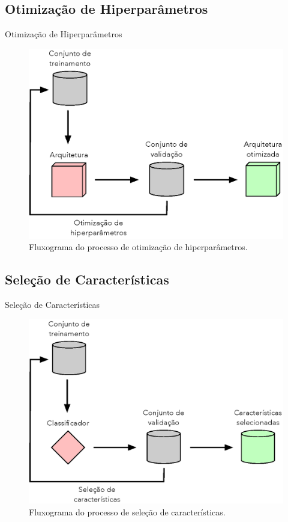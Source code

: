 \subsection{Otimização de Hiperparâmetros}
\label{ss.applications_hyperparameter}

\begin{frame}{Otimização de Hiperparâmetros}
	\begin{figure}
		\centering
		\includegraphics[scale=0.375]{figs/hyperparameter_opt.eps}	
		\caption{Fluxograma do processo de otimização de hiperparâmetros.}
		\label{f.hyperparameter_opt}
	\end{figure}
\end{frame}

\subsection{Seleção de Características}
\label{ss.applications_feature_selection}

\begin{frame}{Seleção de Características}
	\begin{figure}
		\centering
		\includegraphics[scale=0.375]{figs/feature_selection.eps}	
		\caption{Fluxograma do processo de seleção de características.}
		\label{f.feature_selection}
	\end{figure}
\end{frame}